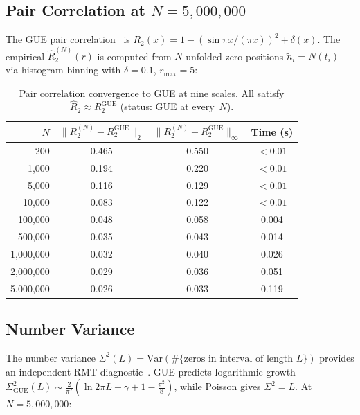 \documentclass[11pt,a4paper]{article}
\theoremstyle{plain}
\theoremstyle{remark}
\newcommand{\norm}[1]{\lVert #1 \rVert}
\begin{document}
\subsection{Pair Correlation at $N=5{,}000{,}000$}
\label{sec:pair-corr}

The GUE pair correlation~\cite{montgomery1973,mehta2004} is
$R_2(x) = 1 - (\sin\pi x/(\pi x))^2 + \delta(x)$.
The empirical $\hat R_2^{(N)}(r)$ is computed from $N$ unfolded zero
positions $\tilde n_i = N(t_i)$ via histogram binning with
$\delta = 0.1$, $r_{\max} = 5$:

\begin{table}[H]
\centering
\begin{tabular}{rccc}
\toprule
$N$ & $\norm{R_2^{(N)} - R_2^{\mathrm{GUE}}}_2$ & $\norm{R_2^{(N)} - R_2^{\mathrm{GUE}}}_\infty$ & Time (s) \\
\midrule
200         & 0.465 & 0.550 & $<0.01$ \\
1{,}000     & 0.194 & 0.220 & $<0.01$ \\
5{,}000     & 0.116 & 0.129 & $<0.01$ \\
10{,}000    & 0.083 & 0.122 & $<0.01$ \\
100{,}000   & 0.048 & 0.058 & 0.004 \\
500{,}000   & 0.035 & 0.043 & 0.014 \\
1{,}000{,}000 & 0.032 & 0.040 & 0.026 \\
2{,}000{,}000 & 0.029 & 0.036 & 0.051 \\
5{,}000{,}000 & 0.026 & 0.033 & 0.119 \\
\bottomrule
\end{tabular}
\caption{Pair correlation convergence to GUE at nine scales.
  All satisfy $\hat R_2\approx R_2^{\mathrm{GUE}}$ (status: GUE at
  every~$N$).}
\label{tab:pair-corr}
\end{table}

\subsection{Number Variance}
\label{sec:number-var}

The number variance $\Sigma^2(L) = \mathrm{Var}(\#\{\text{zeros in interval
of length } L\})$ provides an independent RMT diagnostic~\cite{mehta2004}.
GUE predicts logarithmic growth
$\Sigma^2_{\mathrm{GUE}}(L) \sim \frac{2}{\pi^2}(\ln 2\pi L
+ \gamma + 1 - \tfrac{\pi^2}{8})$, while Poisson gives $\Sigma^2 = L$.
At $N = 5{,}000{,}000$:
\end{document}
